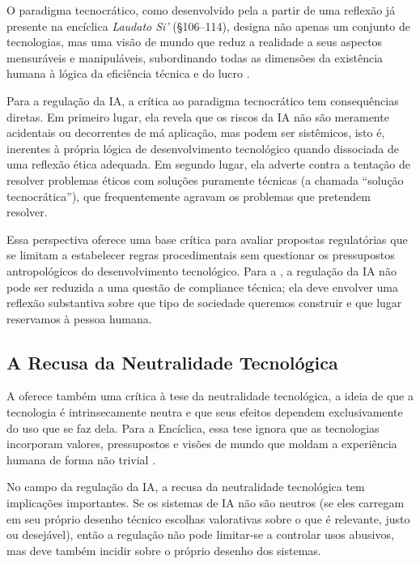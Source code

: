 O paradigma tecnocrático, como desenvolvido pela \MH{} a partir de uma reflexão já presente na encíclica \textit{Laudato Si'} (§106–114), designa não apenas um conjunto de tecnologias, mas uma visão de mundo que reduz a realidade a seus aspectos mensuráveis e manipuláveis, subordinando todas as dimensões da existência humana à lógica da eficiência técnica e do lucro \cite{Francisco2015LS, LeaoXIV2026MH}.

Para a regulação da IA, a crítica ao paradigma tecnocrático tem consequências diretas. Em primeiro lugar, ela revela que os riscos da IA não são meramente acidentais ou decorrentes de má aplicação, mas podem ser sistêmicos, isto é, inerentes à própria lógica de desenvolvimento tecnológico quando dissociada de uma reflexão ética adequada. Em segundo lugar, ela adverte contra a tentação de resolver problemas éticos com soluções puramente técnicas (a chamada ``solução tecnocrática''), que frequentemente agravam os problemas que pretendem resolver.

Essa perspectiva oferece uma base crítica para avaliar propostas regulatórias que se limitam a estabelecer regras procedimentais sem questionar os pressupostos antropológicos do desenvolvimento tecnológico. Para a \MH{}, a regulação da IA não pode ser reduzida a uma questão de compliance técnica; ela deve envolver uma reflexão substantiva sobre que tipo de sociedade queremos construir e que lugar reservamos à pessoa humana.

\subsection{A Recusa da Neutralidade Tecnológica}
\label{subsec:recusa-neutralidade}

A \MH{} oferece também uma crítica à tese da neutralidade tecnológica, a ideia de que a tecnologia é intrinsecamente neutra e que seus efeitos dependem exclusivamente do uso que se faz dela. Para a Encíclica, essa tese ignora que as tecnologias incorporam valores, pressupostos e visões de mundo que moldam a experiência humana de forma não trivial \cite{LeaoXIV2026MH}.

No campo da regulação da IA, a recusa da neutralidade tecnológica tem implicações importantes. Se os sistemas de IA não são neutros (se eles carregam em seu próprio desenho técnico escolhas valorativas sobre o que é relevante, justo ou desejável), então a regulação não pode limitar-se a controlar usos abusivos, mas deve também incidir sobre o próprio desenho dos sistemas.

